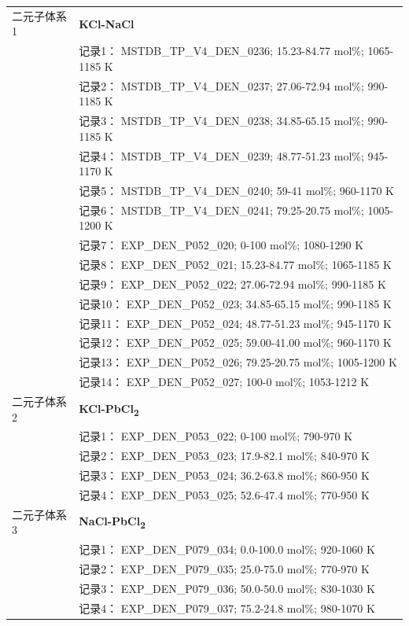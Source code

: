 \documentclass[12pt]{article}
\begin{document}
{\begin{longtable}[]{@{}
  >{\raggedright\arraybackslash}p{}
  >{\raggedright\arraybackslash}p{}@{}}
二元子体系 1  & \textbf{KCl-NaCl} \\
 & 记录1： MSTDB\_TP\_V4\_DEN\_0236; 15.23-84.77 mol\%; 1065-1185 K \\
 & 记录2： MSTDB\_TP\_V4\_DEN\_0237; 27.06-72.94 mol\%; 990-1185 K \\
 & 记录3： MSTDB\_TP\_V4\_DEN\_0238; 34.85-65.15 mol\%; 990-1185 K \\
 & 记录4： MSTDB\_TP\_V4\_DEN\_0239; 48.77-51.23 mol\%; 945-1170 K \\
 & 记录5： MSTDB\_TP\_V4\_DEN\_0240; 59-41 mol\%; 960-1170 K \\
 & 记录6： MSTDB\_TP\_V4\_DEN\_0241; 79.25-20.75 mol\%; 1005-1200 K \\
 & 记录7： EXP\_DEN\_P052\_020; 0-100 mol\%; 1080-1290 K \\
 & 记录8： EXP\_DEN\_P052\_021; 15.23-84.77 mol\%; 1065-1185 K \\
 & 记录9： EXP\_DEN\_P052\_022; 27.06-72.94 mol\%; 990-1185 K \\
 & 记录10： EXP\_DEN\_P052\_023; 34.85-65.15 mol\%; 990-1185 K \\
 & 记录11： EXP\_DEN\_P052\_024; 48.77-51.23 mol\%; 945-1170 K \\
 & 记录12： EXP\_DEN\_P052\_025; 59.00-41.00 mol\%; 960-1170 K \\
 & 记录13： EXP\_DEN\_P052\_026; 79.25-20.75 mol\%; 1005-1200 K \\
 & 记录14： EXP\_DEN\_P052\_027; 100-0 mol\%; 1053-1212 K  \\

二元子体系 2  & \textbf{KCl-PbCl\textsubscript{2}} \\
 & 记录1： EXP\_DEN\_P053\_022; 0-100 mol\%; 790-970 K \\
 & 记录2： EXP\_DEN\_P053\_023; 17.9-82.1 mol\%; 840-970 K \\
 & 记录3： EXP\_DEN\_P053\_024; 36.2-63.8 mol\%; 860-950 K \\
 & 记录4： EXP\_DEN\_P053\_025; 52.6-47.4 mol\%; 770-950 K  \\

二元子体系 3  & \textbf{NaCl-PbCl\textsubscript{2}} \\
 & 记录1： EXP\_DEN\_P079\_034; 0.0-100.0 mol\%; 920-1060 K \\
 & 记录2： EXP\_DEN\_P079\_035; 25.0-75.0 mol\%; 770-970 K \\
 & 记录3： EXP\_DEN\_P079\_036; 50.0-50.0 mol\%; 830-1030 K \\
 & 记录4： EXP\_DEN\_P079\_037; 75.2-24.8 mol\%; 980-1070 K  \\


\end{longtable}}
\end{document}
